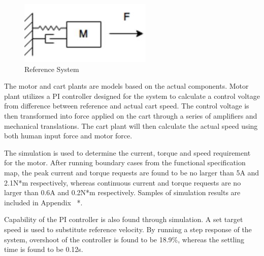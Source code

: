 \begin{figure}[htbp]
	\centering
	\includegraphics[width=0.5\linewidth]{Images/MSB}
	\caption{Reference System}
	\label{MSB}
\end{figure}

The motor and cart plants are models based on the actual components. Motor plant utilizes a PI controller designed for the system to calculate a control voltage from difference between reference and actual cart speed. The control voltage is then transformed into force applied on the cart through a series of amplifiers and mechanical translations. The cart plant will then calculate the actual speed using both human input force and motor force.

The simulation is used to determine the current, torque and speed requirement for the motor. After running boundary cases from the functional specification map, the peak current and torque requests are found to be no larger than 5A and 2.1N*m respectively, whereas continuous current and torque requests are no larger than 0.6A and 0.2N*m respectively. Samples of simulation results are included in Appendix {{\color{red}\ *}}.

Capability of the PI controller is also found through simulation. A set target speed is used to substitute reference velocity. By running a step response of the system, overshoot of the controller is found to be 18.9\%, whereas the settling time is found to be 0.12s.